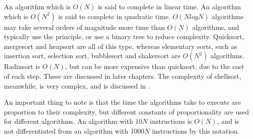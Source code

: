 An algorithm which is $O(N)$ is said to complete in linear time. An algorithm
which is $O(N^2)$ is said to complete in quadratic time.  $O(NlogN)$ algorithms
may take several orders of magnitude more time than $O(N)$ algorithms, and
typically use the  principle, or use a binary tree to
reduce complexity. Quicksort, mergesort and heapsort are all of this type,
whereas elementary sorts, such as insertion sort, selection sort, bubblesort and
shakersort are $O(N^2)$ algorithms. Radixsort is $O(N)$, but can be more
expensive than quicksort, due to the cost of each step. These are discussed in
later chapters. The complexity of shellsort, meanwhile, is very complex, and is
discussed in \cite{Sedgewick96}.

An important thing to note is that the time the algorithms take to execute are
proportion to their complexity, but different constants of proportionality are
used for different algorithms. An algorithm with $10N$ instructions is $O(N)$,
and is not differentiated from an algorithm with $1000N$ instructions by this
notation.
